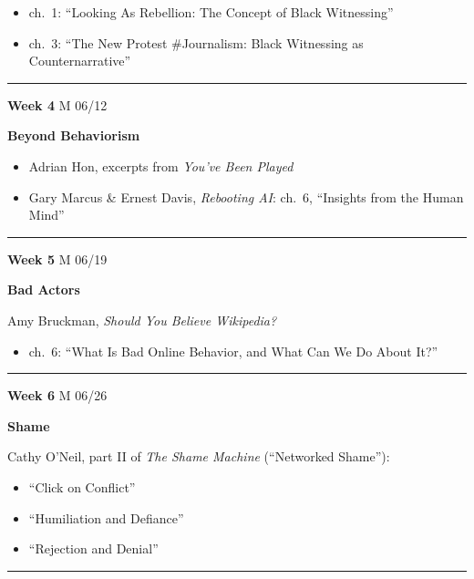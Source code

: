 \documentclass[
  letterpaper,
  DIV=11,
  numbers=noendperiod]{scrartcl}
\providecommand{\tightlist}{%
  \setlength{\itemsep}{0pt}\setlength{\parskip}{0pt}}\usepackage{longtable,booktabs,array}
\begin{document}
\begin{itemize}
\tightlist
\item
  ch.~1: ``Looking As Rebellion: The Concept of Black Witnessing''
\item
  ch.~3: ``The New Protest \#Journalism: Black Witnessing as
  Counternarrative''
\end{itemize}

\begin{center}\rule{0.5\linewidth}{0.5pt}\end{center}

\textbf{Week 4} M 06/12

\textbf{Beyond Behaviorism}

\begin{itemize}
\tightlist
\item
  Adrian Hon, excerpts from \emph{You've Been Played}
\item
  Gary Marcus \& Ernest Davis, \emph{Rebooting AI}: ch.~6, ``Insights
  from the Human Mind''
\end{itemize}

\begin{center}\rule{0.5\linewidth}{0.5pt}\end{center}

\textbf{Week 5} M 06/19

\textbf{Bad Actors}

Amy Bruckman, \emph{Should You Believe Wikipedia?}

\begin{itemize}
\tightlist
\item
  ch.~6: ``What Is Bad Online Behavior, and What Can We Do About It?''
\end{itemize}

\begin{center}\rule{0.5\linewidth}{0.5pt}\end{center}

\textbf{Week 6} M 06/26

\textbf{Shame}

Cathy O'Neil, part II of \emph{The Shame Machine} (``Networked Shame''):

\begin{itemize}
\tightlist
\item
  ``Click on Conflict''
\item
  ``Humiliation and Defiance''
\item
  ``Rejection and Denial''
\end{itemize}

\begin{center}\rule{0.5\linewidth}{0.5pt}\end{center}
\end{document}
